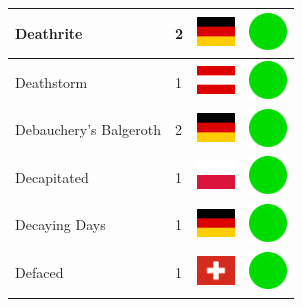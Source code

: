 \documentclass[12pt, a4paper, twoside]{report}
\begin{document}
\begin{center}
\begin{longtable}{|p{5cm}|p{2cm}|p{2cm}|p{2cm}|}
			Deathrite & 2 & \includegraphics[width=1cm]{4x3/de} & \includegraphics[width=1cm]{likes/y} \\ \hline
			Deathstorm & 1 & \includegraphics[width=1cm]{4x3/at} & \includegraphics[width=1cm]{likes/y} \\ \hline
			Debauchery's Balgeroth & 2 & \includegraphics[width=1cm]{4x3/de} & \includegraphics[width=1cm]{likes/y} \\ \hline
			Decapitated & 1 & \includegraphics[width=1cm]{4x3/pl} & \includegraphics[width=1cm]{likes/y} \\ \hline
			Decaying Days & 1 & \includegraphics[width=1cm]{4x3/de} & \includegraphics[width=1cm]{likes/y} \\ \hline
			Defaced & 1 & \includegraphics[width=1cm]{4x3/ch} & \includegraphics[width=1cm]{likes/y} \\ \hline

\end{longtable}
\end{center}
\end{document}

